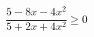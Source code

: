 \begin{ex}[type=inequality]
	\begin{condition}
		$ \dfrac{5 - 8x - 4x^2}{5 + 2x + 4x^2}\geqslant0 $
	\end{condition}
	\answer{$ [-2,5;0,5] $}
\end{ex}